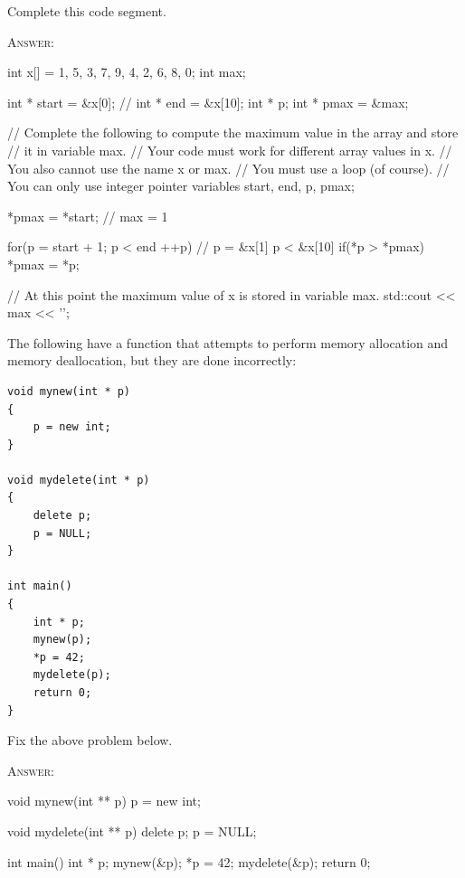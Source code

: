 \newpage
\nextq
Complete this code segment.

\textsc{Answer:}
\begin{answercode}
int x[] = {1, 5, 3, 7, 9, 4, 2, 6, 8, 0};
int max;

int * start = &x[0]; // 
int * end = &x[10];
int * p;
int * pmax = &max;

// Complete the following to compute the maximum value in the array and store
// it in variable max.
// Your code must work for different array values in x.
// You also cannot use the name x or max.
// You must use a loop (of course).
// You can only use integer pointer variables start, end, p, pmax;

*pmax = *start; // max = 1

for(p = start + 1; p < end ++p) // p = &x[1] p < &x[10]
{
        if(*p > *pmax) *pmax = *p;
}


// At this point the maximum value of x is stored in variable max.
std::cout << max << '\n';
\end{answercode}

\newpage
\nextq
The following have a function that attempts to perform memory allocation
and memory deallocation, but
they are done incorrectly:
\vspace{-3mm}
\begin{Verbatim}[frame=single,fontsize=\small]
void mynew(int * p)
{
    p = new int;
}

void mydelete(int * p)
{
    delete p;
    p = NULL;
}

int main()
{
    int * p;
    mynew(p);
    *p = 42;
    mydelete(p);
    return 0;
}
\end{Verbatim}
\vspace{-5mm}Fix the above problem below.

\textsc{Answer:}\vspace{-3mm}
\begin{answercode}
void mynew(int ** p)
{
        p = new int;
}

void mydelete(int ** p)
{
        delete p;
        p = NULL;
}

int main()
{
    int * p;
    mynew(&p);
    *p = 42;
    mydelete(&p);
    return 0;
}
\end{answercode}

